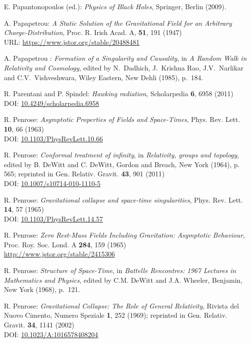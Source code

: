 \begin{thebibliography}{123}
E. Papantonopoulos (ed.): {\em Physics of Black Holes}, Springer, Berlin (2009).

A. Papapetrou:
{\em A Static Solution of the Gravitational Field for an Arbitrary Charge-Distribution},
Proc. R. Irish Acad. A, {\bf 51}, 191 (1947)\\
URL: \url{https://www.jstor.org/stable/20488481}

A. Papapetrou : {\em Formation of a Singularity and Causality},
in {\em A Random Walk in Relativity and Cosmology},
edited by N.~Dadhich, J.~Krishna Rao, J.V.~Narlikar and C.V.~Vishveshwara,
Wiley Eastern, New Dehli (1985), p.~184.

R. Parentani and P. Spindel:
{\em Hawking radiation},
Scholarpedia {\bf 6}, 6958 (2011)\\
DOI: \href{https://doi.org/10.4249/scholarpedia.6958}{10.4249/scholarpedia.6958}

R. Penrose: {\em Asymptotic Properties of Fields and Space-Times},
Phys. Rev. Lett. {\bf 10}, 66 (1963)\\
DOI: \href{https://doi.org/10.1103/PhysRevLett.10.66}{10.1103/PhysRevLett.10.66}

R. Penrose: {\em Conformal treatment of infinity}, in {\em Relativity, groups and topology},
edited by B. DeWitt and C. DeWitt,
Gordon and Breach, New York (1964), p. 565; reprinted in
Gen. Relativ. Gravit. {\bf 43}, 901 (2011)\\
DOI: \href{https://doi.org/10.1007/s10714-010-1110-5}{10.1007/s10714-010-1110-5}

R. Penrose: {\em Gravitational collapse and space-time singularities},
Phys. Rev. Lett. {\bf 14}, 57 (1965)\\
DOI: \href{https://doi.org/10.1103/PhysRevLett.14.57}{10.1103/PhysRevLett.14.57}

R. Penrose:
{\em Zero Rest-Mass Fields Including Gravitation: Asymptotic Behaviour},
Proc. Roy. Soc. Lond. A {\bf 284}, 159 (1965)\\
\url{http://www.jstor.org/stable/2415306}

R. Penrose: {\em Structure of Space-Time},
in {\em Battelle Rencontres: 1967 Lectures in Mathematics and Physics},
edited by C.M. DeWitt and J.A. Wheeler,
Benjamin, New York (1968), p.~121.

R. Penrose: {\em Gravitational Collapse: The Role of General Relativity},
Rivista del Nuovo Cimento, Numero Speziale {\bf 1}, 252 (1969); reprinted in
Gen. Relativ. Gravit. {\bf 34}, 1141 (2002)\\
DOI: \href{https://doi.org/10.1023/A:1016578408204}{10.1023/A:1016578408204}


\end{thebibliography}
